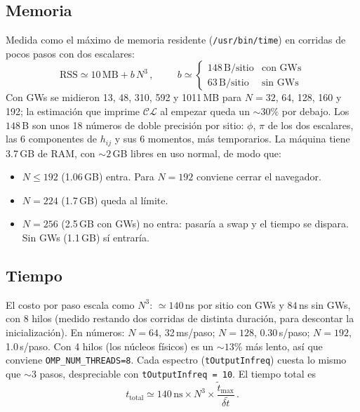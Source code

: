 \documentclass[11pt]{article}
\newcommand{\CosmoLattice}{\ensuremath{\mathcal{C}}\text{osmo}\ensuremath{\mathcal{L}}\text{attice}\xspace}
\begin{document}
        \subsection{Memoria}

            Medida como el máximo de memoria residente (\texttt{/usr/bin/time}) en corridas de pocos pasos con dos escalares:
            \begin{equation}
                \text{RSS} \simeq 10\,\text{MB} + b \, N^3 \, ,
                \hspace{1cm}
                b \simeq
                \begin{cases}
                    148\,\text{B/sitio} & \text{con GWs} \\
                    63\,\text{B/sitio} & \text{sin GWs}
                \end{cases}
            \end{equation}
            Con GWs se midieron 13, 48, 310, 592 y 1011\,MB para $N = 32$, 64, 128, 160 y 192; la estimación que imprime \CosmoLattice al empezar queda un $\sim 30\%$ por debajo. Los $148$\,B son unos 18 números de doble precisión por sitio: $\phi$, $\pi$ de los dos escalares, las 6 componentes de $h_{ij}$ y sus 6 momentos, más temporarios. La máquina tiene 3.7\,GB de RAM, con $\sim 2$\,GB libres en uso normal, de modo que:
            \begin{itemize}
                \item $N \le 192$ (1.06\,GB) entra. Para $N = 192$ conviene cerrar el navegador.
                \item $N = 224$ (1.7\,GB) queda al límite.
                \item $N = 256$ (2.5\,GB con GWs) no entra: pasaría a swap y el tiempo se dispara. Sin GWs (1.1\,GB) sí entraría.
            \end{itemize}

        \subsection{Tiempo}

            El costo por paso escala como $N^3$: $\simeq 140$\,ns por sitio con GWs y $84$\,ns sin GWs, con 8 hilos (medido restando dos corridas de distinta duración, para descontar la inicialización). En números: $N = 64$, 32\,ms/paso; $N = 128$, 0.30\,s/paso; $N = 192$, 1.0\,s/paso. Con 4 hilos (los núcleos físicos) es un $\sim 13\%$ más lento, así que conviene \texttt{OMP\_NUM\_THREADS=8}. Cada espectro (\texttt{tOutputInfreq}) cuesta lo mismo que $\sim 3$ pasos, despreciable con \texttt{tOutputInfreq = 10}. El tiempo total es
            \begin{equation}
                t_{\text{total}} \simeq 140\,\text{ns} \times N^3 \times \frac{\tilde t_{\max}}{\delta\tilde t} \, .
            \end{equation}
\end{document}
